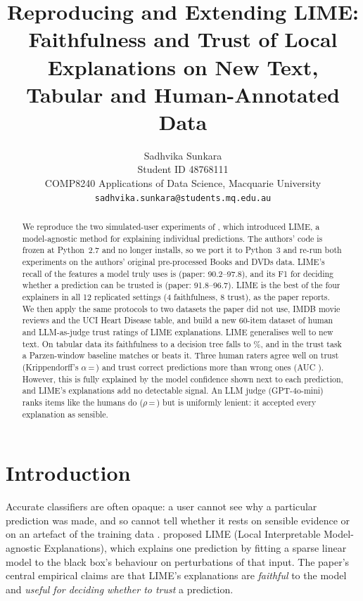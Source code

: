\documentclass[11pt]{article}
\title{Reproducing and Extending LIME: Faithfulness and Trust of Local\\Explanations on New Text, Tabular and Human-Annotated Data}
\author{Sadhvika Sunkara \\
  Student ID 48768111 \\
  COMP8240 Applications of Data Science, Macquarie University \\
  \texttt{sadhvika.sunkara@students.mq.edu.au}}
\begin{document}
\maketitle

\begin{abstract}
We reproduce the two simulated-user experiments of \citet{ribeiro2016}, which introduced LIME, a model-agnostic method for explaining individual predictions. The authors' code is frozen at Python~2.7 and no longer installs, so we port it to Python~3 and re-run both experiments on the authors' original pre-processed Books and DVDs data. LIME's recall of the features a model truly uses is \ReplRecallRange{} (paper: 90.2--97.8), and its F1 for deciding whether a prediction can be trusted is \ReplTrustRange{} (paper: 91.8--96.7). LIME is the best of the four explainers in all 12 replicated settings (4 faithfulness, 8 trust), as the paper reports. We then apply the same protocols to two datasets the paper did not use, IMDB movie reviews and the UCI Heart Disease table, and build a new 60-item dataset of human and LLM-as-judge trust ratings of LIME explanations. LIME generalises well to new text. On tabular data its faithfulness to a decision tree falls to \HeartTreeRecall{}\%, and in the trust task a Parzen-window baseline matches or beats it. Three human raters agree well on trust (Krippendorff's $\alpha$\,=\,\AlphaTrust{}) and trust correct predictions more than wrong ones (AUC \AUCHuman{}). However, this is fully explained by the model confidence shown next to each prediction, and LIME's explanations add no detectable signal. An LLM judge (GPT-4o-mini) ranks items like the humans do ($\rho$\,=\,\LLMvsHumanRho{}) but is uniformly lenient: it accepted every explanation as sensible.
\end{abstract}

\section{Introduction}
Accurate classifiers are often opaque: a user cannot see why a particular prediction was made, and so cannot tell whether it rests on sensible evidence or on an artefact of the training data \citep{doshivelez2017}. \citet{ribeiro2016} proposed LIME (Local Interpretable Model-agnostic Explanations), which explains one prediction by fitting a sparse linear model to the black box's behaviour on perturbations of that input. The paper's central empirical claims are that LIME's explanations are \emph{faithful} to the model and \emph{useful for deciding whether to trust} a prediction.
\end{document}
